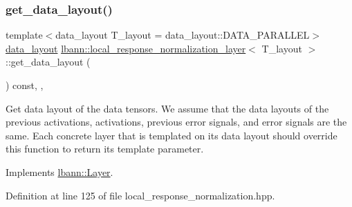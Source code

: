 \mbox{\label{classlbann_1_1local__response__normalization__layer_a7a161dde860f17264077a0cc4797fe36}} 
\subsubsection{\texorpdfstring{get\+\_\+data\+\_\+layout()}{get\_data\_layout()}}
{\footnotesize\ttfamily template$<$data\+\_\+layout T\+\_\+layout = data\+\_\+layout\+::\+D\+A\+T\+A\+\_\+\+P\+A\+R\+A\+L\+L\+EL$>$ \\
\hyperlink{base_8hpp_a786677cbfb3f5677b4d84f3056eb08db}{data\+\_\+layout} \hyperlink{classlbann_1_1local__response__normalization__layer}{lbann\+::local\+\_\+response\+\_\+normalization\+\_\+layer}$<$ T\+\_\+layout $>$\+::get\+\_\+data\+\_\+layout (\begin{DoxyParamCaption}{ }\end{DoxyParamCaption}) const\hspace{0.3cm}{\ttfamily [inline]}, {\ttfamily [override]}, {\ttfamily [virtual]}}

Get data layout of the data tensors. We assume that the data layouts of the previous activations, activations, previous error signals, and error signals are the same. Each concrete layer that is templated on its data layout should override this function to return its template parameter. 

Implements \hyperlink{classlbann_1_1Layer_a5dfb66e81fc085997402a5e2241316bd}{lbann\+::\+Layer}.



Definition at line 125 of file local\+\_\+response\+\_\+normalization.\+hpp.


